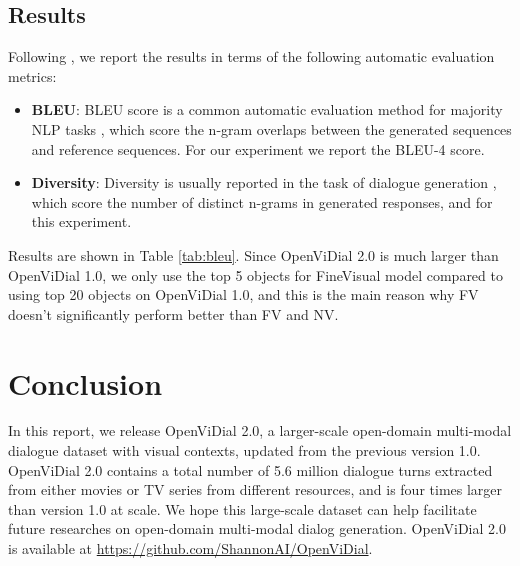 \documentclass[11pt,a4paper]{article}
\begin{document}
\subsection{Results}
Following \citet{wang2021modeling}, we report the results in terms of the following automatic evaluation metrics: 
\begin{itemize}
    \item {\bf BLEU}: BLEU score is a common automatic evaluation method for majority NLP tasks \citep{papineni2002bleu, sordoni2015neural}, which score the n-gram overlaps between the generated sequences and reference sequences. For our experiment we report the BLEU-4 score.
    \item {\bf Diversity}: Diversity is usually reported in the task of dialogue generation \cite{li2015diversity}, which score the number of distinct n-grams in generated responses, and  for this experiment. 
\end{itemize}
Results are shown in Table \ref{tab:bleu}. Since OpenViDial 2.0 is much larger than OpenViDial 1.0, we only use the top 5 objects for FineVisual model compared to using top 20 objects on OpenViDial 1.0, and this is the main reason why FV doesn't significantly perform better than FV and NV. 

\section{Conclusion}
In this report, we release OpenViDial 2.0, a larger-scale open-domain multi-modal dialogue dataset with visual contexts, updated from the previous version 1.0. 
OpenViDial 2.0 contains a total number of 5.6 million dialogue turns extracted from either movies or TV series from different resources,
and is four times larger than version 1.0 at scale. 
We hope this large-scale dataset can help facilitate future researches on open-domain multi-modal dialog generation.
OpenViDial 2.0 is available at \url{https://github.com/ShannonAI/OpenViDial}.



\end{document}
